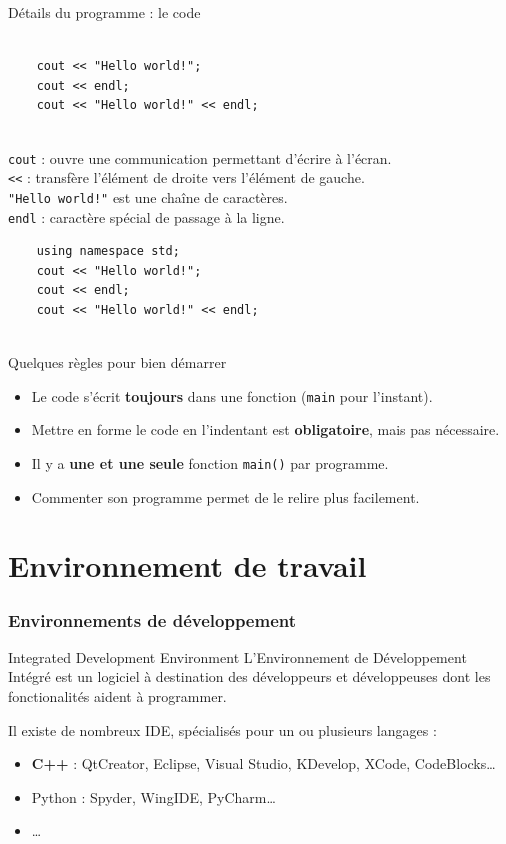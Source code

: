 \begin{frame}[fragile]{Détails du programme : le code}
    \begin{verbatim}
        
    cout << "Hello world!";
    cout << endl;
    cout << "Hello world!" << endl;
        
    \end{verbatim}

    \texttt{cout} : ouvre une communication permettant d'écrire à l'écran.\\
    \texttt{<<} : transfère l'élément de droite vers l'élément de gauche.\\
    \texttt{"Hello world!"} est une chaîne de caractères.\\
    \texttt{endl} : caractère spécial de passage à la ligne.

    \begin{verbatim}
    using namespace std;    
    cout << "Hello world!";
    cout << endl;
    cout << "Hello world!" << endl;
        
    \end{verbatim}
\end{frame}

\begin{frame}{Quelques règles pour bien démarrer}
    \begin{itemize}
        \item Le code s'écrit \textbf{toujours} dans une fonction (\texttt{main} pour l'instant).
        \item Mettre en forme le code en l'indentant est \textbf{obligatoire}, mais pas nécessaire.
        \item Il y a \textbf{une et une seule} fonction \texttt{main()} par programme.
        \item Commenter son programme permet de le relire plus facilement.
    \end{itemize}
\end{frame}

\section{Environnement de travail}

\begin{frame}
  \frametitle{Environnements de développement}

  \begin{block}{Integrated Development Environment}
      L'Environnement de Développement Intégré est un logiciel à destination des développeurs et développeuses dont les fonctionalités aident à programmer.
  \end{block}

  Il existe de nombreux IDE, spécialisés pour un ou plusieurs langages :
  \begin{itemize}
  \item \textbf{C++} : QtCreator, Eclipse, Visual Studio, KDevelop, XCode, CodeBlocks\dots
  \item Python : Spyder, WingIDE, PyCharm\dots
  \item \dots
  \end{itemize}
\end{frame}

